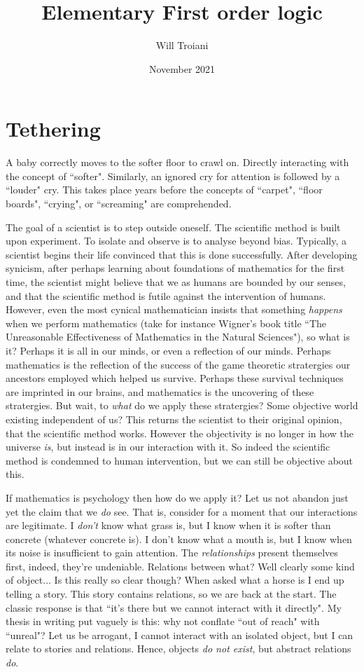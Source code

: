 \documentclass[12pt]{article}
\title{Elementary First order logic}
\author{Will Troiani}
\date{November 2021}
\theoremstyle{plain}
\theoremstyle{definition}
\begin{document}
	
	\maketitle
	\section{Tethering}
	A baby correctly moves to the softer floor to crawl on. Directly interacting with the concept of ``softer". Similarly, an ignored cry for attention is followed by a ``louder" cry. This takes place years before the concepts of ``carpet", ``floor boards", ``crying", or ``screaming" are comprehended.
	
	The goal of a scientist is to step outside oneself. The scientific method is built upon experiment. To isolate and observe is to analyse beyond bias. Typically, a scientist begins their life convinced that this is done successfully. After developing synicism, after perhaps learning about foundations of mathematics for the first time, the scientist might believe that we as humans are bounded by our senses, and that the scientific method is futile against the intervention of humans. However, even the most cynical mathematician insists that something \emph{happens} when we perform mathematics (take for instance Wigner's book title ``The Unreasonable Effectiveness of Mathematics in the Natural Sciences"), so what is it? Perhaps it is all in our minds, or even a reflection of our minds. Perhaps mathematics is the reflection of the success of the game theoretic stratergies our ancestors employed which helped us survive. Perhaps these survival techniques are imprinted in our brains, and mathematics is the uncovering of these stratergies. But wait, to \emph{what} do we apply these stratergies? Some objective world existing independent of us? This returns the scientist to their original opinion, that the scientific method works. However the objectivity is no longer in how the universe \emph{is}, but instead is in our interaction with it. So indeed the scientific method is condemned to human intervention, but we can still be objective about this.
	
	If mathematics is psychology then how do we apply it? Let us not abandon just yet the claim that we \emph{do} see. That is, consider for a moment that our interactions are legitimate. I \emph{don't} know what grass is, but I know when it is softer than concrete (whatever concrete is). I don't know what a mouth is, but I know when its noise is insufficient to gain attention. The \emph{relationships} present themselves first, indeed, they're undeniable. Relations between what? Well clearly some kind of object... Is this really so clear though? When asked what a horse is I end up telling a story. This story contains relations, so we are back at the start. The classic response is that ``it's there but we cannot interact with it directly". My thesis in writing put vaguely is this: why not conflate ``out of reach" with ``unreal"? Let us be arrogant, I cannot interact with an isolated object, but I can relate to stories and relations. Hence, objects \emph{do not exist}, but abstract relations \emph{do}.
	
\end{document}
